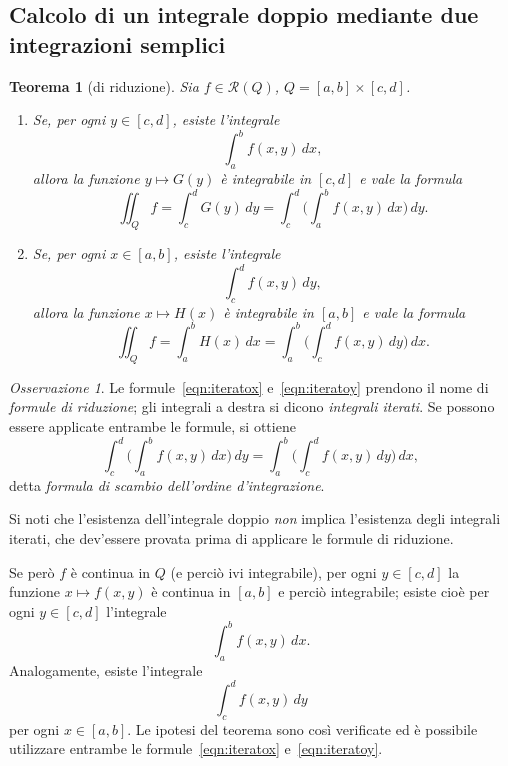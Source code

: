 \documentclass[a4paper]{book}
\numberwithin{equation}{section}
\theoremstyle{plain}
\newtheorem{teor}{Teorema}[section]
\theoremstyle{definition}
\theoremstyle{remark}
\newtheorem{oss}{Osservazione}[section]
\theoremstyle{example}
\begin{document}
\subsection{Calcolo di un integrale doppio mediante due integrazioni semplici}
\begin{teor}[di riduzione]
Sia $f \in \mathcal{R}(Q)$, $Q = [a, b] \times [c, d]$.
	\begin{enumerate}
	\item Se, per ogni $y \in [c, d]$, esiste l'integrale
		\begin{equation*}
		\int_a^b f(x, y) \, dx,
		\end{equation*}
	allora la funzione $y \mapsto G(y)$ è integrabile in $[c, d]$ e vale la formula
		\begin{equation}
		\label{eqn:iteratox}
		\iint_Q f = \int_c^d G(y)\, dy = \int_c^d \biggl( \int_a^b f(x, y) \, dx \biggr) \, dy.
		\end{equation}

	\item Se, per ogni $x \in [a, b]$, esiste l'integrale
		\begin{equation*}
		\int_c^d f(x,y) \, dy,
		\end{equation*}
	allora la funzione $x \mapsto H(x)$ è integrabile in $[a, b]$ e vale la formula
		\begin{equation}
		\label{eqn:iteratoy}
		\iint_Q f = \int_a^b H(x) \, dx = \int_a^b \biggl( \int_c^d f(x,y) \, dy \biggr) \, dx.
		\end{equation}
	\end{enumerate}
\end{teor}

\begin{oss}
Le formule~\eqref{eqn:iteratox} e~\eqref{eqn:iteratoy} prendono il nome di \emph{formule di riduzione}; gli integrali a destra si dicono \emph{integrali iterati}. Se possono essere applicate entrambe le formule, si ottiene
	\begin{equation}
	\int_c^d \biggl( \int_a^b f(x,y) \, dx \biggr) \, dy = \int_a^b \biggl( \int_c^d f(x,y) \,dy \biggr) \, dx,
	\end{equation}
detta \emph{formula di scambio dell'ordine d'integrazione}.
\end{oss}

Si noti che l'esistenza dell'integrale doppio \emph{non} implica l'esistenza degli integrali iterati, che dev'essere provata prima di applicare le formule di riduzione.

Se però $f$ è continua in $Q$ (e perciò ivi integrabile), per ogni $y \in [c,d]$ la funzione $x \mapsto f(x, y)$ è continua in $[a, b]$ e perciò integrabile; esiste cioè per ogni $y \in [c, d]$ l'integrale
	\begin{equation*}
	\int_a^b f(x,y) \, dx.
	\end{equation*}
Analogamente, esiste l'integrale
	\begin{equation*}
	\int_c^d f(x,y) \, dy
	\end{equation*}
per ogni $x \in [a, b]$. Le ipotesi del teorema sono così verificate ed è possibile utilizzare entrambe le formule~\eqref{eqn:iteratox} e~\eqref{eqn:iteratoy}.
\end{document}
